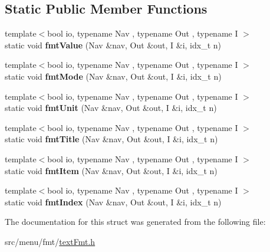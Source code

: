 \subsection*{Static Public Member Functions}
\begin{DoxyCompactItemize}
\item 
\mbox{\label{structTextFmt_a9549293218cae398f696c4f70657768a}} 
{\footnotesize template$<$bool io, typename Nav , typename Out , typename I $>$ }\\static void {\bfseries fmt\+Value} (Nav \&nav, Out \&out, I \&i, idx\+\_\+t n)
\item 
\mbox{\label{structTextFmt_a5f1cbec0608bca7db5f489239c041f9e}} 
{\footnotesize template$<$bool io, typename Nav , typename Out , typename I $>$ }\\static void {\bfseries fmt\+Mode} (Nav \&nav, Out \&out, I \&i, idx\+\_\+t n)
\item 
\mbox{\label{structTextFmt_a3e8f61c8e76fee55fa6f21cd5f95b57d}} 
{\footnotesize template$<$bool io, typename Nav , typename Out , typename I $>$ }\\static void {\bfseries fmt\+Unit} (Nav \&nav, Out \&out, I \&i, idx\+\_\+t n)
\item 
\mbox{\label{structTextFmt_ada6a9b8c051e2510f81b435cc43f5a71}} 
{\footnotesize template$<$bool io, typename Nav , typename Out , typename I $>$ }\\static void {\bfseries fmt\+Title} (Nav \&nav, Out \&out, I \&i, idx\+\_\+t n)
\item 
\mbox{\label{structTextFmt_a639276039aced38f5f23cfb98d7acfb6}} 
{\footnotesize template$<$bool io, typename Nav , typename Out , typename I $>$ }\\static void {\bfseries fmt\+Item} (Nav \&nav, Out \&out, I \&i, idx\+\_\+t n)
\item 
\mbox{\label{structTextFmt_a809f84b0f9e6ed2fcc62cfa22185a6d0}} 
{\footnotesize template$<$bool io, typename Nav , typename Out , typename I $>$ }\\static void {\bfseries fmt\+Index} (Nav \&nav, Out \&out, I \&i, idx\+\_\+t n)
\end{DoxyCompactItemize}


The documentation for this struct was generated from the following file\+:\begin{DoxyCompactItemize}
\item 
src/menu/fmt/\hyperlink{textFmt_8h}{text\+Fmt.\+h}\end{DoxyCompactItemize}

